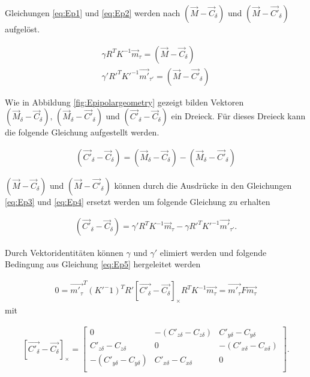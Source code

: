 Gleichungen \ref{eq:Ep1} und \ref{eq:Ep2} werden nach $(\vec{M}-\vec{C}_\delta)$ und $(\vec{M}-\vec{C'}_\delta)$ aufgelöst.

\begin{gather}
	\gamma R^TK^{-1}\vec{m}_\tau = (\vec{M}-\vec{C}_\delta)\label{eq:Ep3}\\
	\gamma' R'^TK'^{-1}\vec{m'}_{\tau'} = (\vec{M}-\vec{C'}_\delta)\label{eq:Ep4}
\end{gather}


Wie in Abbildung \ref{fig:Epipolargeometry} gezeigt bilden Vektoren $(\vec{M}_\delta - \vec{C}_\delta),\, (\vec{M}_\delta - \vec{C'}_\delta)$ und $(\vec{C'}_\delta - \vec{C}_\delta)$ ein Dreieck. Für dieses Dreieck kann die folgende Gleichung aufgestellt werden. 

\begin{gather}
	(\vec{C'}_\delta - \vec{C}_\delta) = (\vec{M}_\delta - \vec{C}_\delta) - (\vec{M}_\delta - \vec{C'}_\delta)
\end{gather}

$(\vec{M}-\vec{C}_\delta)$ und $(\vec{M} - \vec{C'}_\delta)$ können durch die Ausdrücke in den Gleichungen \ref{eq:Ep3} und \ref{eq:Ep4} ersetzt werden um folgende Gleichung zu erhalten

\begin{gather}
	(\vec{C'}_\delta - \vec{C}_\delta) = \gamma' R^TK^{-1}\vec{m}_\tau - \gamma R'^TK'^{-1}\vec{m'}_{\tau'}. \label{eq:Ep5}
\end{gather}

Durch Vektoridentitäten können $\gamma$ und $\gamma'$ elimiert werden und folgende Bedingung  aus Gleichung \ref{eq:Ep5} hergeleitet werden \cite{Bronstein} %

\begin{gather}
	0=\vec{m'_\tau}^T(K'^-1)^TR' \left[ \vec{C'_\delta}-\vec{C_\delta}\right]_\times R^TK^{-1}\vec{m_\tau}=\vec{m'_\tau}F\vec{m_\tau}\label{eq:Ep6}
\end{gather}
mit  

\begin{gather}
	\left[ \vec{C'_\delta}-\vec{C_\delta}\right]_\times=
	\begin{bmatrix}0&-(C'_{z\delta}-C_{z\delta})&C'_{y\delta}-C_{y\delta}\\
		C'_{z\delta}-C_{z\delta}&0&-(C'_{x\delta}-C_{x\delta})\\
		-(C'_{y\delta}-C_{y\delta})&C'_{x \delta}-C_{x\delta}&0\\
	\end{bmatrix}.
\end{gather}


